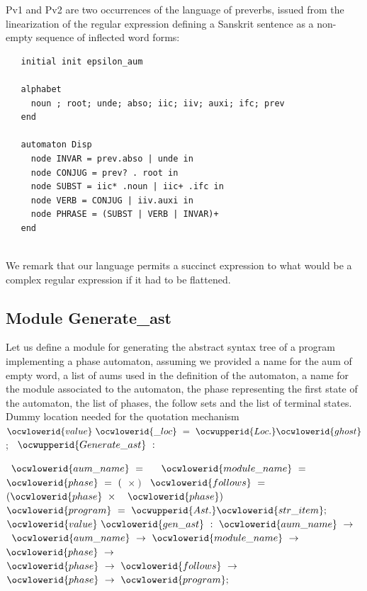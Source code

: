 \documentclass[12pt]{article}
\begin{document}
Pv1 and Pv2 are two occurrences of the language of preverbs, issued from the linearization
of the regular expression defining a Sanskrit sentence as a non-empty sequence of inflected word forms:
   \begin{verbatim}
   initial init epsilon_aum

   alphabet 
     noun ; root; unde; abso; iic; iiv; auxi; ifc; prev
   end

   automaton Disp
     node INVAR = prev.abso | unde in
     node CONJUG = prev? . root in
     node SUBST = iic* .noun | iic+ .ifc in 
     node VERB = CONJUG | iiv.auxi in
     node PHRASE = (SUBST | VERB | INVAR)+
   end
  
   \end{verbatim}

We remark that our language permits a succinct expression to what would be a
  complex regular expression if it had to be flattened. 
\ocweol
\ocwindent{0.00em}
\subsection{Module Generate\_ast} 
\ocweol
\ocwindent{0.00em}
Let us define a module for generating the abstract syntax tree of a program 
   implementing a phase automaton, assuming we provided a name for the
   aum of empty word, a list of aums used in the definition of the automaton, 
   a name for the module associated to the automaton, the phase
   representing the first state of the automaton, the list of phases, the 
   follow sets and the list of terminal states. 
\ocweol
\ocwindent{0.00em}
Dummy location needed for the quotation mechanism 
\ocweol
\label{../ML/regular.ml:20474}%
\medskip
\ocwbegincode{}\ocwindent{0.00em}
$\ocwlowerid{value}~\ocwlowerid{\_loc}~=~\ocwupperid{Loc.}\ocwlowerid{ghost}$\ocweol
\ocwindent{0.00em}
;\ocweol
\ocwindent{0.00em}
~$\ocwupperid{Generate\_ast}~:~$\medskip

\label{../ML/regular.ml:20526}%
\ocwindent{1.00em}
~$\ocwlowerid{aum\_name}~=~$~\ocweol
\ocwindent{1.00em}
~$\ocwlowerid{module\_name}~=~$\ocweol
\ocwindent{1.00em}
~$\ocwlowerid{phase}~=~($~$\times{}~$$)$\ocweol
\ocwindent{1.00em}
~$\ocwlowerid{follows}~=~$~$(\ocwlowerid{phase}~\times{}~$~$\ocwlowerid{phase})$\ocweol
\ocwindent{1.00em}
~$\ocwlowerid{program}~=~\ocwupperid{Ast.}\ocwlowerid{str\_item};$\ocweol
\ocwindent{1.00em}
$\ocwlowerid{value}~\ocwlowerid{gen\_ast}~:~\ocwlowerid{aum\_name}~\rightarrow{}~$~$\ocwlowerid{aum\_name}~\rightarrow{}~\ocwlowerid{module\_name}~\rightarrow{}~$\ocweol
\ocwindent{4.00em}
$\ocwlowerid{phase}~\rightarrow{}~$~$\ocwlowerid{phase}~\rightarrow{}~\ocwlowerid{follows}~\rightarrow{}~$\ocweol
\ocwindent{4.00em}
~$\ocwlowerid{phase}~\rightarrow{}~\ocwlowerid{program};$\medskip
\end{document}
